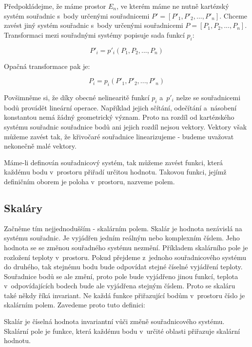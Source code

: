 \documentclass{book}
\begin{document}
Předpokládejme, že máme prostor \(E_n\), ve kterém máme ne nutně kartézský systém souřadnic s~body určenými souřadnicemi \(P' = [P'_1, P'_2, ..., P'_n]\). Chceme zavést jiný systém souřadnic s~body určenými souřadnicemi \(P = [P_1, P_2, ..., P_n]\). Transformaci mezi souřadnými systémy popisuje sada funkcí \(p_i\):

\begin{equation}
P'_i = p'_i(P_1, P_2, ..., P_n)
\end{equation}

Opačná transformace pak je:

\begin{equation}
P_i = p_i(P'_1, P'_2, ..., P'_n)
\end{equation}

Povšimněme si, že díky obecné nelinearitě funkcí \(p_i\) a~\(p'_i\) nelze se souřadnicemi bodů provádět lineární operace. Například jejich sčítání, odečítání a~násobení konstantou nemá žádný geometrický význam. Proto na rozdíl od kartézského systému souřadnic souřadnice bodů ani jejich rozdíl nejsou vektory. Vektory však můžeme zavést tak, že křivočaré souřadnice linearizujeme - budeme uvažovat nekonečně malé vektory.

Máme-li definován souřadnicový systém, tak můžeme zavést funkci, která každému bodu v~prostoru přiřadí určitou hodnotu. Takovou funkci, jejímž definičním oborem je poloha v~prostoru, nazveme polem. 

\subsection{Skaláry}

Začněme tím nejjednodušším - skalárním polem. Skalár je hodnota nezávislá na systému souřadnic. Je vyjádřen jedním reálným nebo komplexním číslem. Jeho hodnota se se změnou souřadného systému nezmění. Příkladem skalárního pole je rozložení teploty v~prostoru. Pokud přejdeme z~jednoho souřadnicového systému do druhého, tak stejnému bodu bude odpovídat stejné číselné vyjádření teploty. Souřadnice bodů se ale změní, proto pole bude vyjádřeno jinou funkcí, teplota v~odpovídajících bodech bude ale vyjádřena stejným číslem. Proto se skaláru také někdy říká invariant. Ne každá funkce přiřazující bodům v~prostoru číslo je skalárním polem. Zavedeme proto tuto definici:

\begin{fact}
Skalár je číselná hodnota invariantní vůči změně souřadnicového systému. Skalární pole je funkce, která každému bodu v~určité oblasti přiřazuje skalární hodnotu.
\end{fact}
\end{document}
